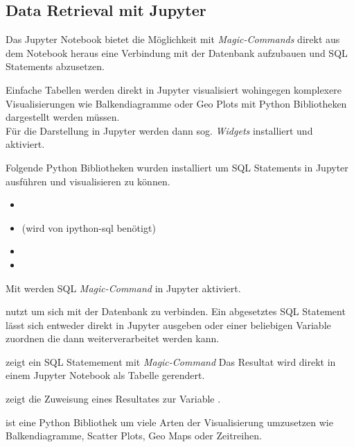 \subsection{Data Retrieval mit Jupyter}\label{subsec:jupyter}
Das Jupyter Notebook bietet die Möglichkeit mit \textit{Magic-Commands} direkt aus dem Notebook heraus
eine Verbindung mit der Datenbank aufzubauen und \ac{SQL} Statements abzusetzen.

Einfache Tabellen werden direkt in Jupyter visualisiert wohingegen komplexere Visualisierungen wie \zb{}
Balkendiagramme oder Geo Plots mit Python Bibliotheken dargestellt werden müssen.
\\
Für die Darstellung in Jupyter werden dann sog. \textit{Widgets} installiert und aktiviert.

Folgende Python Bibliotheken wurden installiert um \ac{SQL} Statements in Jupyter ausführen und visualisieren zu können.
\begin{itemize}
  \item {}
  \item {} (wird von ipython-sql benötigt)
  \item {}
  \item {}
\end{itemize}

Mit  werden \ac{SQL} \textit{Magic-Command} in Jupyter aktiviert.

 nutzt  um sich mit der Datenbank zu verbinden.
Ein abgesetztes \ac{SQL} Statement lässt sich entweder direkt in Jupyter ausgeben
oder einer beliebigen Variable zuordnen die dann weiterverarbeitet werden kann.

 zeigt ein \ac{SQL} Statemement mit \textit{Magic-Command}
Das Resultat wird direkt in einem Jupyter Notebook als Tabelle gerendert.

 zeigt die Zuweisung eines Resultates zur Variable .



  ist eine Python Bibliothek um viele Arten der Visualisierung umzusetzen
 wie \zb{} Balkendiagramme, Scatter Plots, Geo Maps oder Zeitreihen.


